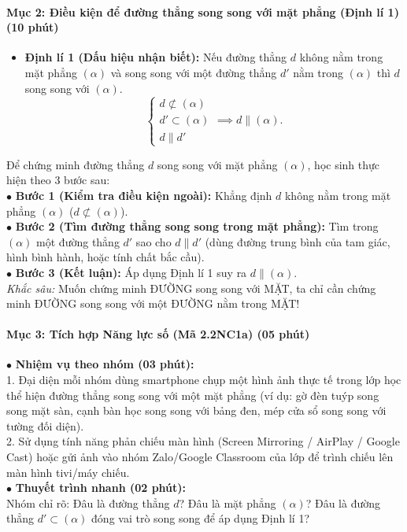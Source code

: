 \documentclass[12pt, a4paper]{article}
\begin{document}
\paragraph{Mục 2: Điều kiện để đường thẳng song song với mặt phẳng (Định lí 1) (10 phút)}
\begin{itemize}
    \item \textbf{Định lí 1 (Dấu hiệu nhận biết):} Nếu đường thẳng $d$ không nằm trong mặt phẳng $(\alpha)$ và song song với một đường thẳng $d'$ nằm trong $(\alpha)$ thì $d$ song song với $(\alpha)$.
    $$\begin{cases} d \not\subset (\alpha) \\ d' \subset (\alpha) \\ d \parallel d' \end{cases} \implies d \parallel (\alpha).$$
\end{itemize}

\begin{scaffoldbox}
    Để chứng minh đường thẳng $d$ song song với mặt phẳng $(\alpha)$, học sinh thực hiện theo 3 bước sau:\\
    $\bullet$ \textbf{Bước 1 (Kiểm tra điều kiện ngoài):} Khẳng định $d$ không nằm trong mặt phẳng $(\alpha)$ ($d \not\subset (\alpha)$).\\
    $\bullet$ \textbf{Bước 2 (Tìm đường thẳng song song trong mặt phẳng):} Tìm trong $(\alpha)$ một đường thẳng $d'$ sao cho $d \parallel d'$ (dùng đường trung bình của tam giác, hình bình hành, hoặc tính chất bắc cầu).\\
    $\bullet$ \textbf{Bước 3 (Kết luận):} Áp dụng Định lí 1 suy ra $d \parallel (\alpha)$.\\
    \textit{Khắc sâu:} Muốn chứng minh ĐƯỜNG song song với MẶT, ta chỉ cần chứng minh ĐƯỜNG song song với một ĐƯỜNG nằm trong MẶT!
\end{scaffoldbox}

\paragraph{Mục 3: Tích hợp Năng lực số (Mã 2.2NC1a) (05 phút)}

\begin{pedabox}
    $\bullet$ \textbf{Nhiệm vụ theo nhóm (03 phút):}\\
    1. Đại diện mỗi nhóm dùng smartphone chụp một hình ảnh thực tế trong lớp học thể hiện đường thẳng song song với một mặt phẳng (ví dụ: gờ đèn tuýp song song mặt sàn, cạnh bàn học song song với bảng đen, mép cửa sổ song song với tường đối diện).\\
    2. Sử dụng tính năng phản chiếu màn hình (Screen Mirroring / AirPlay / Google Cast) hoặc gửi ảnh vào nhóm Zalo/Google Classroom của lớp để trình chiếu lên màn hình tivi/máy chiếu.\\
    $\bullet$ \textbf{Thuyết trình nhanh (02 phút):}\\
    Nhóm chỉ rõ: Đâu là đường thẳng $d$? Đâu là mặt phẳng $(\alpha)$? Đâu là đường thẳng $d' \subset (\alpha)$ đóng vai trò song song để áp dụng Định lí 1?
\end{pedabox}
\end{document}
